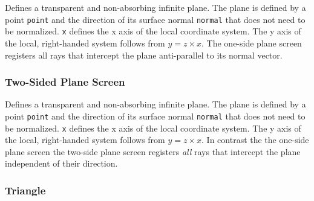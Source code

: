\documentclass[10pt,a4paper,titlepage]{article}
\begin{document}





\vspace{0.25cm}
Defines a transparent and non-absorbing infinite plane. The plane is defined by a point {\tt point} and the direction of its surface normal {\tt normal} that does not need to be normalized. {\tt x} defines the x axis of the local coordinate system. The y axis of the local, right-handed system follows from $y=z \times x$. The one-side plane screen registers all rays that intercept the plane anti-parallel to its normal vector.


\subsubsection{Two-Sided Plane Screen}






\vspace{0.25cm}
Defines a transparent and non-absorbing infinite plane. The plane is defined by a point {\tt point} and the direction of its surface normal {\tt normal} that does not need to be normalized. {\tt x} defines the x axis of the local coordinate system. The y axis of the local, right-handed system follows from $y=z \times x$. In contrast the the one-side plane screen the two-side plane screen registers \emph{all} rays that intercept the plane independent of their direction.


\subsubsection{Triangle}




\end{document}
